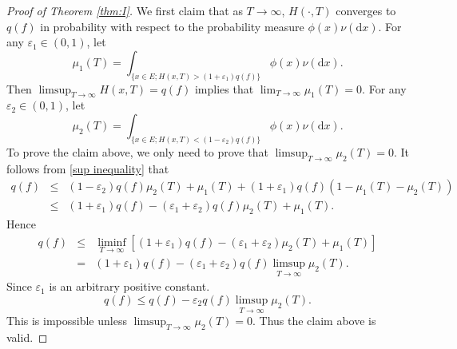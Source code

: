 \documentclass[12pt,a4paper]{amsart}
\numberwithin{equation}{section}
\theoremstyle{plain}
\theoremstyle{definition}
\theoremstyle{remark}
\begin{document}
\begin{proof}[Proof of Theorem \ref{thm:I}]
We first claim that  as $T\to\infty$, $H(\cdot,T)$ converges to $q(f)$ in probability
with respect to the probability measure $\phi(x)\nu(\mathrm dx)$.
For  any $\varepsilon_1\in (0, 1)$, let
$$
\mu_1(T)=\int_{\{x\in E;H(x,T)>(1+\varepsilon_1)q(f)\}}
\phi(x)\nu(\mathrm dx).
$$
Then $\limsup_{T\to\infty}H(x,T)=q(f)$ implies that $\lim_{T\rightarrow\infty}\mu_1(T)=0.$
For any $\varepsilon_2\in (0, 1)$, let
$$
\mu_2(T)=\int_{\{x\in E;H(x,T)<(1-\varepsilon_2)q(f)\}}
\phi(x)\nu(\mathrm dx).
$$
To prove the claim above, we only need to prove that  $\limsup_{T\rightarrow\infty}\mu_2(T)=0.$
It follows  from \eqref{sup inequality} that
\begin{eqnarray}\label{sublimitinprob}
q(f)&\leq&
(1-\varepsilon_2)q(f)\mu_2(T)+\mu_1(T)+(1+\varepsilon_1)q(f)(1-\mu_1(T)-\mu_2(T))\\
&\le
&(1+\varepsilon_1)q(f)-(\varepsilon_1+\varepsilon_2)q(f)\mu_2(T)+\mu_1(T).
\end{eqnarray}
 Hence
\begin{eqnarray*}\label{sublimitinequl}
q(f)&\leq&
\liminf_{T\rightarrow\infty}\left[(1+\varepsilon_1)q(f)-(\varepsilon_1+\varepsilon_2)\mu_2(T)
+\mu_1(T)\right]\\
&=&(1+\varepsilon_1)q(f)-(\varepsilon_1+\varepsilon_2)q(f)\limsup_{T\rightarrow\infty}\mu_2(T).
\end{eqnarray*}
Since $\varepsilon_1$ is an arbitrary positive constant.
\[
q(f)\leq q(f)-\varepsilon_2 q(f)\limsup_{T\rightarrow\infty}\mu_2(T).
\]
This is impossible unless $\limsup_{T\rightarrow\infty}\mu_2(T)=0.$
Thus the claim above is valid.



\end{proof}
\end{document}
